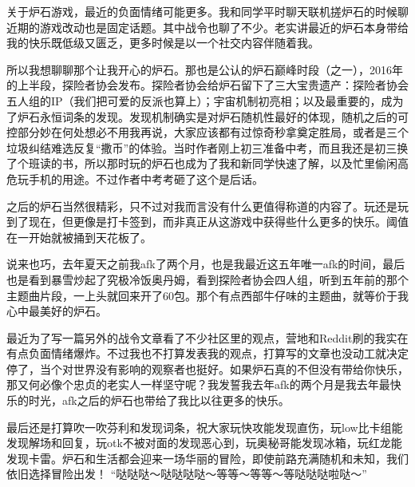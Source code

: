 \documentclass{ctexart}
\theoremstyle{definition}
\begin{document}
关于炉石游戏，最近的负面情绪可能更多。我和同学平时聊天联机搓炉石的时候聊近期的游戏改动也是固定话题。其中战令也聊了不少。老实讲最近的炉石本身带给我的快乐既低级又匮乏，更多时候是以一个社交内容伴随着我。

所以我想聊聊那个让我开心的炉石。那也是公认的炉石巅峰时段（之一），2016年的上半段，探险者协会发布。探险者协会给炉石留下了三大宝贵遗产：探险者协会五人组的IP（我们把可爱的反派也算上）；宇宙机制初亮相；以及最重要的，成为了炉石永恒词条的发现。发现机制确实是对炉石随机性最好的体现，随机之后的可控部分妙在何处想必不用我再说，大家应该都有过惊奇秒拿奠定胜局，或者是三个垃圾纠结难选反复“撒币”的体验。当时作者刚上初三准备中考，而且我还是初三换了个班读的书，所以那时玩的炉石也成为了我和新同学快速了解，以及忙里偷闲高危玩手机的用途。不过作者中考考砸了这个是后话。

之后的炉石当然很精彩，只不过对我而言没有什么更值得称道的内容了。玩还是玩到了现在，但更像是打卡签到，而非真正从这游戏中获得些什么更多的快乐。阈值在一开始就被捅到天花板了。

说来也巧，去年夏天之前我afk了两个月，也是我最近这五年唯一afk的时间，最后也是看到暴雪炒起了究极冷饭奥丹姆，看到探险者协会四人组，听到五年前的那个主题曲片段，一上头就回来开了60包。那个有点西部牛仔味的主题曲，就等价于我心中最美好的炉石。

最近为了写一篇另外的战令文章看了不少社区里的观点，营地和Reddit刷的我实在有点负面情绪爆炸。不过我也不打算发表我的观点，打算写的文章也没动工就决定停了，当个对世界没有影响的观察者也挺好。如果炉石真的不但没有带给你快乐，那又何必像个忠贞的老实人一样坚守呢？我发誓我去年afk的两个月是我去年最快乐的时光，afk之后的炉石也带给了我比以往更多的快乐。

最后还是打算吹一吹芬利和发现词条，祝大家玩快攻能发现直伤，玩low比卡组能发现解场和回复，玩otk不被对面的发现恶心到，玩奥秘哥能发现冰箱，玩红龙能发现卡雷。炉石和生活都会迎来一场华丽的冒险，即使前路充满随机和未知，我们依旧选择冒险出发！
“哒哒哒～哒哒哒哒～等等～等等～等哒哒哒啦哒～”
\end{document}

